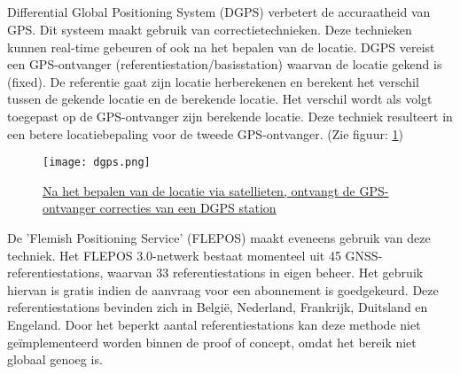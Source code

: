 \subsection{}
Differential Global Positioning System (DGPS) verbetert de accuraatheid van GPS. Dit systeem maakt gebruik van correctietechnieken. Deze technieken kunnen real-time gebeuren of ook na het bepalen van de locatie. DGPS vereist een GPS-ontvanger (referentiestation/basisstation) waarvan de locatie gekend is (fixed). De referentie gaat zijn locatie herberekenen en berekent het verschil tussen de gekende locatie en de berekende locatie. Het verschil wordt als volgt toegepast op de GPS-ontvanger zijn berekende locatie. Deze techniek resulteert in een betere locatiebepaling voor de tweede GPS-ontvanger. \autocite{dgps} (Zie figuur: \ref{fig:dgps})
\begin{figure}
	\texttt{[image: dgps.png]}
	\caption[Differential Global Positioning System]{\href{https://www.researchgate.net/figure/Components-of-a-DGPS-System_fig1_252064818}{Na het bepalen van de locatie via satellieten, ontvangt de GPS-ontvanger correcties van een DGPS station \autocite{fig_dgps}}}
	\label{fig:dgps}
\end{figure}
\newline
De 'Flemish Positioning Service' (FLEPOS) maakt eveneens gebruik van deze techniek. Het FLEPOS 3.0-netwerk bestaat momenteel uit 45 GNSS-referentiestations, waarvan 33 referentiestations in eigen beheer. Het gebruik hiervan is gratis indien de aanvraag voor een abonnement is goedgekeurd. Deze referentiestations bevinden zich in België, Nederland, Frankrijk, Duitsland en Engeland.
\newline
Door het beperkt aantal referentiestations kan deze methode niet geïmplementeerd worden binnen de proof of concept, omdat het bereik niet globaal genoeg is.
